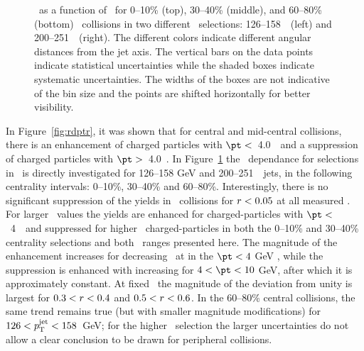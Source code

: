 \begin{figure}
   \caption{\RDptr\ as a function of \pt\ for  0--10\% (top), 30--40\% (middle), and 60--80\% (bottom) \PbPb\ collisions in two different \ptjet\ selections: 126--158~\GeV\ (left) and 200--251~\GeV\ (right). The different colors indicate different angular distances from the jet axis. The vertical bars on the data points indicate statistical uncertainties while the shaded boxes indicate systematic uncertainties. The widths of the boxes are not indicative of the bin size and the points are shifted horizontally for better visibility.}
      \label{fig:pttrkdep}
\end{figure}


In Figure~\ref{fig:rdptr}, it was shown that for central and mid-central collisions, there is an enhancement of
charged particles with $\pt <$~4.0~\GeV\ and a suppression of charged particles with $\pt >$~4.0~\GeV.  In
Figure~\ref{fig:pttrkdep} 
the \pt\ dependance for selections in \rvar\ is directly investigated
 for 126--158 GeV and 200--251~\GeV\ jets, in the following centrality intervals: 0--10\%, 30--40\% and 60--80\%.
Interestingly, there is no significant suppression of the yields in \pbpb\ collisions
for $\mbox{$r$} < 0.05$ at all measured \pt.  For larger \rvar\ values the yields are enhanced for charged-particles with $\pt <$~4~\GeV\ and 
suppressed for higher \pt\ charged-particles in both the 0--10\% and 30--40\% centrality selections and both \ptjet\ 
ranges presented here.  The magnitude of the enhancement increases for decreasing \pt\ at in the $\pt < 4$ GeV \pt, while the suppression is enhanced
with increasing \pt for $4 < \pt < 10$ GeV, after which it is approximately constant.
At fixed \pt\ the magnitude of the deviation from unity is largest for $0.3< \mbox{$r$} < 0.4$ and $0.5< \mbox{$r$} < 0.6$.
In the 60--80\% central collisions, the same trend remains true (but with smaller magnitude 
modifications) for \mbox{$126 < \mbox{$p_{\mathrm{T}}^{\mathrm{jet}}$} < 158$ GeV}; for the higher \ptjet\ selection the larger uncertainties 
do not allow a clear conclusion to be drawn for peripheral collisions.

